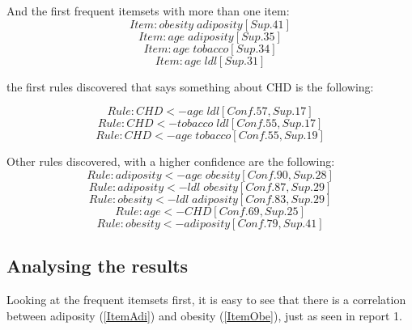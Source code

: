 And the first frequent itemsets with more than one item:
\begin{equation}
\label{ItemObeAdi}
Item: obesity\;adiposity[Sup. 41]
\end{equation}
\begin{equation}
\label{ItemAgeAdi}
Item: age\;adiposity[Sup. 35]
\end{equation}
\begin{equation}
\label{ItemAgeTobacco}
Item: age\;tobacco[Sup. 34]
\end{equation}
\begin{equation}
\label{ItemAgeLdl}
Item: age\;ldl[Sup. 31]
\end{equation}


the first rules discovered that says something about CHD is the following:

\begin{equation}
\label{RuleChdAgeLdl}
Rule: CHD <- age\;ldl[Conf. 57,Sup. 17]
\end{equation}
\begin{equation}
\label{RuleChdTobaccoLdl}
Rule: CHD <- tobacco\;ldl[Conf. 55,Sup. 17]
\end{equation}
\begin{equation}
\label{RuleChdAgeTobacco}
Rule: CHD <- age\;tobacco[Conf. 55,Sup. 19]
\end{equation}

Other rules discovered, with a higher confidence are the following:
\begin{equation}
\label{RuleAdiAgeOb}
Rule: adiposity <- age\;obesity[Conf. 90,Sup. 28]
\end{equation}
\begin{equation}
\label{RuleAdiLdlOb}
Rule: adiposity <- ldl\;obesity[Conf. 87,Sup. 29]
\end{equation}
\begin{equation}
\label{RuleObLdlAdi}
Rule: obesity <- ldl\;adiposity[Conf. 83,Sup. 29]
\end{equation}
\begin{equation}
\label{RuleAgeCHD}
Rule: age <- CHD[Conf. 69,Sup. 25]
\end{equation}
\begin{equation}
\label{RuleObeAdi}
Rule: obesity <- adiposity[Conf. 79,Sup. 41]
\end{equation}


\subsection{Analysing the results}
Looking at the frequent itemsets first, it is easy to see that there is a correlation between adiposity (\ref{ItemAdi}) and obesity (\ref{ItemObe}), just as seen in report 1. 

